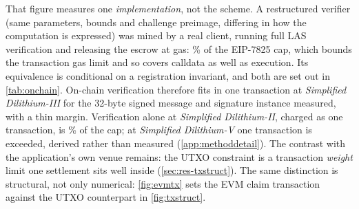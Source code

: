 That figure measures one \emph{implementation}, not the scheme. A restructured verifier
(same parameters, bounds and challenge preimage, differing in how the computation is
expressed) was mined by a real client, running full LAS verification and releasing the
escrow at \gasOptReceipt{} gas: \gasOptCapPct\% of the EIP-7825 cap, which bounds the
transaction gas limit and so covers calldata as well as execution. Its equivalence is
conditional on a registration invariant, and both are set out in \cref{tab:onchain}.
On-chain verification therefore fits in one transaction at \emph{Simplified
Dilithium-III} for the 32-byte signed message and signature instance measured, with a
thin margin. Verification alone at \emph{Simplified Dilithium-II}, charged as one
transaction, is \gasDTwoCapPct\% of the cap; at \emph{Simplified Dilithium-V} one
transaction is exceeded, derived rather than measured (\cref{app:methoddetail}). The
contrast with the application's own venue remains: the UTXO constraint is a transaction
\emph{weight} limit one settlement sits well inside (\cref{sec:res-txstruct}). The same
distinction is structural, not only numerical: \cref{fig:evmtx} sets the EVM claim
transaction against the UTXO counterpart in \cref{fig:txstruct}.

